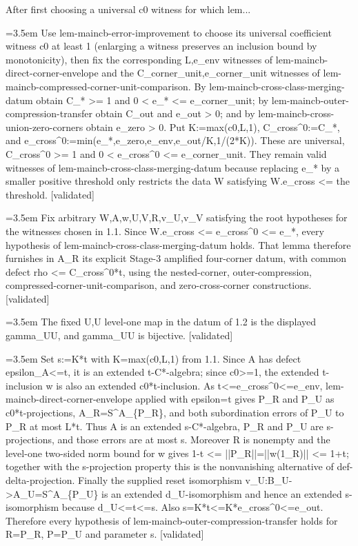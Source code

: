 \documentclass{article}
\newcommand{\step}[1]{\par\noindent\hangindent=3.5em\hangafter=1%
  \makebox[3.5em][l]{\textbf{#1.}}}
\newcommand{\steptag}[1]{\hfill{\small\textsf{[#1]}}}
\begin{document}
\begin{proofbox}{After first choosing a universal c0 witness for which lem...}
\step{1.1} Use lem-maincb-error-improvement to choose its universal coefficient witness c0 at least 1 (enlarging a witness preserves an inclusion bound by monotonicity), then fix the corresponding L,e\_env witnesses of lem-maincb-direct-corner-envelope and the C\_corner\_unit,e\_corner\_unit witnesses of lem-maincb-compressed-corner-unit-comparison. By lem-maincb-cross-class-merging-datum obtain C\_* >= 1 and 0 < e\_* <= e\_corner\_unit; by lem-maincb-outer-compression-transfer obtain C\_out and e\_out > 0; and by lem-maincb-cross-union-zero-corners obtain e\_zero > 0. Put K:=max(c0,L,1), C\_cross\textasciicircum{}0:=C\_*, and e\_cross\textasciicircum{}0:=min(e\_*,e\_zero,e\_env,e\_out/K,1/(2*K)). These are universal, C\_cross\textasciicircum{}0 >= 1 and 0 < e\_cross\textasciicircum{}0 <= e\_corner\_unit. They remain valid witnesses of lem-maincb-cross-class-merging-datum because replacing e\_* by a smaller positive threshold only restricts the data W satisfying W.e\_cross <= the threshold. \steptag{validated} \\[4pt]
\step{1.2} Fix arbitrary W,A,w,U,V,R,v\_U,v\_V satisfying the root hypotheses for the witnesses chosen in 1.1. Since W.e\_cross <= e\_cross\textasciicircum{}0 <= e\_*, every hypothesis of lem-maincb-cross-class-merging-datum holds. That lemma therefore furnishes in A\_R its explicit Stage-3 amplified four-corner datum, with common defect rho <= C\_cross\textasciicircum{}0*t, using the nested-corner, outer-compression, compressed-corner-unit-comparison, and zero-cross-corner constructions. \steptag{validated} \\[4pt]
\step{1.3} The fixed U,U level-one map in the datum of 1.2 is the displayed gamma\_UU, and gamma\_UU is bijective. \steptag{validated} \\[6pt]
\step{1.3.1} Set s:=K*t with K=max(c0,L,1) from 1.1. Since A has defect epsilon\_A<=t, it is an extended t-C*-algebra; since c0>=1, the extended t-inclusion w is also an extended c0*t-inclusion. As t<=e\_cross\textasciicircum{}0<=e\_env, lem-maincb-direct-corner-envelope applied with epsilon=t gives P\_R and P\_U as c0*t-projections, A\_R=S\textasciicircum{}A\_\{P\_R\}, and both subordination errors of P\_U to P\_R at most L*t. Thus A is an extended s-C*-algebra, P\_R and P\_U are s-projections, and those errors are at most s. Moreover R is nonempty and the level-one two-sided norm bound for w gives 1-t <= ||P\_R||=||w(1\_R)|| <= 1+t; together with the s-projection property this is the nonvanishing alternative of def-delta-projection. Finally the supplied reset isomorphism v\_U:B\_U->A\_U=S\textasciicircum{}A\_\{P\_U\} is an extended d\_U-isomorphism and hence an extended s-isomorphism because d\_U<=t<=s. Also s=K*t<=K*e\_cross\textasciicircum{}0<=e\_out. Therefore every hypothesis of lem-maincb-outer-compression-transfer holds for R=P\_R, P=P\_U and parameter s. \steptag{validated} \\[4pt]

\end{proofbox}
\end{document}
